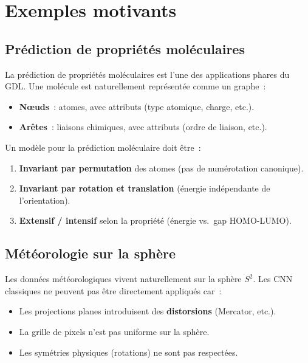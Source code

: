\section{Exemples motivants}

\subsection{Pr\'ediction de propri\'et\'es mol\'eculaires}

La pr\'ediction de propri\'et\'es mol\'eculaires est l'une des applications phares
du GDL. Une mol\'ecule est naturellement repr\'esent\'ee comme un graphe~:
\begin{itemize}
    \item \textbf{N\oe uds}~: atomes, avec attributs (type atomique, charge, etc.).
    \item \textbf{Ar\^etes}~: liaisons chimiques, avec attributs (ordre de liaison, etc.).
\end{itemize}

\begin{proposition}
Un mod\`ele pour la pr\'ediction mol\'eculaire doit \^etre~:
\begin{enumerate}
    \item \textbf{Invariant par permutation} des atomes (pas de num\'erotation canonique).
    \item \textbf{Invariant par rotation et translation} (\'energie ind\'ependante
          de l'orientation).
    \item \textbf{Extensif / intensif} selon la propri\'et\'e (\'energie vs.\ gap HOMO-LUMO).
\end{enumerate}
\end{proposition}

\subsection{M\'et\'eorologie sur la sph\`ere}

Les donn\'ees m\'et\'eorologiques vivent naturellement sur la sph\`ere $S^2$.
Les CNN classiques ne peuvent pas \^etre directement appliqu\'es car~:
\begin{itemize}
    \item Les projections planes introduisent des \textbf{distorsions} (Mercator, etc.).
    \item La grille de pixels n'est pas uniforme sur la sph\`ere.
    \item Les sym\'etries physiques (rotations) ne sont pas respect\'ees.
\end{itemize}

